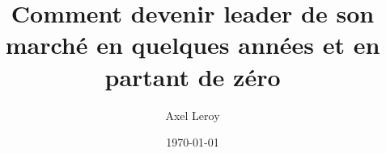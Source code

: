 \documentclass[11pt, a4paper, french]{report}
\title{Comment devenir leader de son marché en quelques années et en partant de zéro}
\author{Axel Leroy}
\date{\today}
\begin{document}


\newpage
~
\thispagestyle{empty}
\newpage

\thispagestyle{empty}


\newpage
\thispagestyle{empty}
\newpage

\thispagestyle{empty}


\tableofcontents
\thispagestyle{empty}
\setcounter{page}{0}

\newpage
~
\thispagestyle{empty}
\setcounter{page}{0}
\newpage











\newpage
\nocite{SpaceXFirstISS, IFPI2011Report, SpotifyBloomberg, SpotifyNewYorker}
\printbibliography
\end{document}
